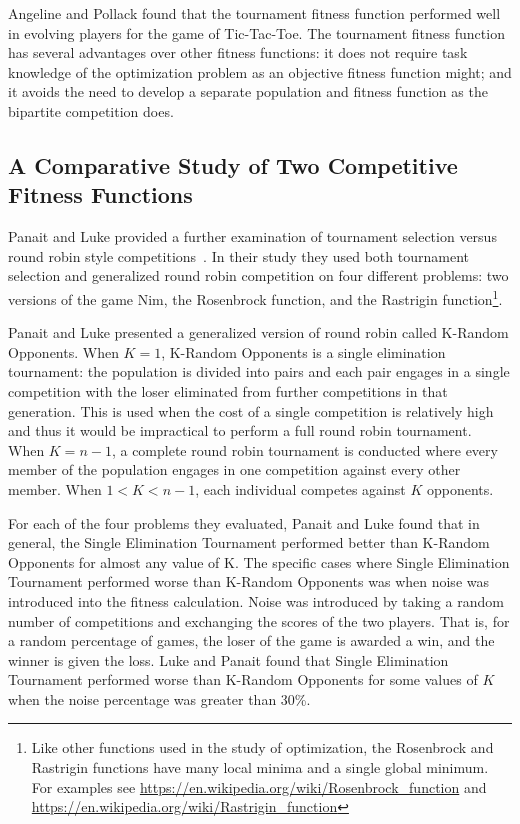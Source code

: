 Angeline and Pollack found that the tournament fitness function performed well
in evolving players for the game of Tic-Tac-Toe. The tournament fitness function
has several advantages over other fitness functions: it does not require task
knowledge of the optimization problem as an objective fitness function might;
and it avoids the need to develop a separate population and fitness function as
the bipartite competition does.

\subsection{A Comparative Study of Two Competitive Fitness Functions}

Panait and Luke provided a further examination of tournament selection versus
round robin style competitions~\cite{Panait02acomparative}. In their study they
used both tournament selection and generalized round robin competition on four
different problems: two versions of the game Nim, the Rosenbrock function, and
the Rastrigin function\footnote{Like other functions used in the study of
optimization, the Rosenbrock and Rastrigin functions have many local minima and
a single global minimum. For examples see
\url{https://en.wikipedia.org/wiki/Rosenbrock_function} and
\url{https://en.wikipedia.org/wiki/Rastrigin_function}}.

Panait and Luke presented a generalized version of round robin called K-Random
Opponents. When \(K=1\), K-Random Opponents is a single elimination
tournament: the population is divided into pairs and each pair engages in a
single competition with the loser eliminated from further competitions in that
generation. This is used when the cost of a single competition is relatively
high and thus it would be impractical to perform a full round robin tournament.
When \(K=n-1\), a complete round robin tournament is conducted where every
member of the population engages in one competition against every other member.
When \(1 < K < n-1\), each individual competes against \(K\) opponents.

For each of the four problems they evaluated, Panait and Luke found that in
general, the Single Elimination Tournament performed better than K-Random
Opponents for almost any value of K. The specific cases where Single Elimination
Tournament performed worse than K-Random Opponents was when noise was introduced
into the fitness calculation. Noise was introduced by taking a random number of
competitions and exchanging the scores of the two players. That is, for a random
percentage of games, the loser of the game is awarded a win, and the winner is
given the loss. Luke and Panait found that Single Elimination Tournament
performed worse than K-Random Opponents for some values of \(K\) when the noise
percentage was greater than 30\%.

